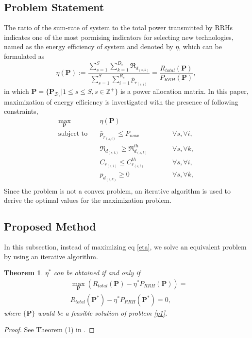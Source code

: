 \documentclass[conference,10pt,twocolumn,letter]{IEEEtran}
\newtheorem{theorem}{Theorem}
\begin{document}
\subsection{Problem Statement}
The ratio of the sum-rate of system to the total power transmitted by RRHs indicates one of the most pormising indicators for selecting new technologies, named as the energy efficiency of system and denoted by $\eta$, which can be formulated as
\begin{equation}\label{eta}
\eta(\boldsymbol{P}) := \frac{\sum\limits_{s=1}^{S} \sum\limits_{k=1}^{{D}_s}\mathfrak{R}_{d_{(s,k)}} }{\sum\limits_{s=1}^{S} \sum\limits_{i=1}^{{R}_s}\bar{p}_{r_{(s,i)}}} = \frac{R_{total}(\boldsymbol{P})}{P_{RRH}(\boldsymbol{P})},
\end{equation}
in which $ \boldsymbol{P} = \{ \boldsymbol{P}_{\mathcal{D}_s}|  1 \leq s \leq S, s \in \mathbb{Z}^{+} \}$ is a power allocation matrix.
In this paper, maximization of energy efficiency is investigated with the presence of following constraints, 
\begin{equation}\label{p1}
\begin{aligned}
\max\limits_{\boldsymbol{P}}   \quad &   \eta(\boldsymbol{P})\\
\text{subject to} \quad  & \bar{p}_{r_{(s,i)}} \leq P_{max} && \qquad \forall s, \forall i,   \\
&\mathfrak{R}_{d_{(s,k)}} \geq  \mathfrak{R}_{d_{(s,k)}}^{th} && \qquad \forall s, \forall k, \\
&C_{r_{(s,i)}} \leq C_{r_{(s,i)}}^{th}  &&\qquad \forall s, \forall i, \\
&p_{d_{(s,k)}}  \geq 0                                  &&\qquad \forall s, \forall k, \\
\end{aligned}			
\end{equation}
Since the problem is not a convex problem, an iterative algorithm is used to derive the optimal values for the maximization problem. 
\subsection{Proposed Method}
In this subsection, instead of maximizing eq \eqref{eta}, we solve an equivalent problem by using an iterative algorithm. 
\begin{theorem}\label{t2}
 $\eta^*$ can be obtained if and only if 
\begin{equation}\label{q2}
\begin{split}
&\max \limits_{\boldsymbol{P}} (R_{total}(\boldsymbol{P}) - \eta^* P_{RRH}(\boldsymbol{P}))=\\
& R_{total}(\boldsymbol{P}^*) - \eta^* P_{RRH}(\boldsymbol{P}^*) =0,
\end{split}
\end{equation}
where $\{\boldsymbol{P}\}$ would be a feasible solution of problem \eqref{p1}.
\end{theorem}
\begin{proof}
See Theorem (1) in \cite{11}.
\end{proof}
\end{document}
